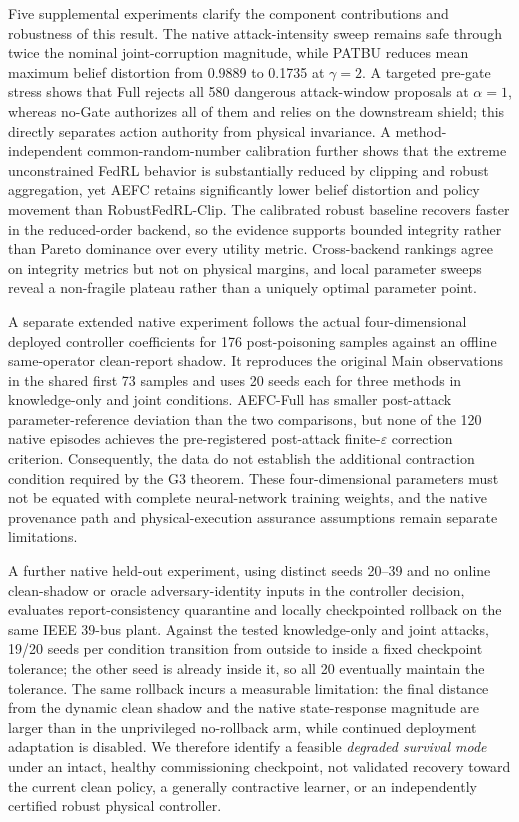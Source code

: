 Five supplemental experiments clarify the component contributions and robustness of this result. The native attack-intensity sweep remains safe through twice the nominal joint-corruption magnitude, while PATBU reduces mean maximum belief distortion from 0.9889 to 0.1735 at $\gamma=2$. A targeted pre-gate stress shows that Full rejects all 580 dangerous attack-window proposals at $\alpha=1$, whereas no-Gate authorizes all of them and relies on the downstream shield; this directly separates action authority from physical invariance. A method-independent common-random-number calibration further shows that the extreme unconstrained FedRL behavior is substantially reduced by clipping and robust aggregation, yet AEFC retains significantly lower belief distortion and policy movement than RobustFedRL-Clip. The calibrated robust baseline recovers faster in the reduced-order backend, so the evidence supports bounded integrity rather than Pareto dominance over every utility metric. Cross-backend rankings agree on integrity metrics but not on physical margins, and local parameter sweeps reveal a non-fragile plateau rather than a uniquely optimal parameter point.

A separate extended native experiment follows the actual four-dimensional deployed controller coefficients for 176 post-poisoning samples against an offline same-operator clean-report shadow. It reproduces the original Main observations in the shared first 73 samples and uses 20 seeds each for three methods in knowledge-only and joint conditions. AEFC-Full has smaller post-attack parameter-reference deviation than the two comparisons, but none of the 120 native episodes achieves the pre-registered post-attack finite-$\varepsilon$ correction criterion. Consequently, the data do not establish the additional contraction condition required by the G3 theorem. These four-dimensional parameters must not be equated with complete neural-network training weights, and the native provenance path and physical-execution assurance assumptions remain separate limitations.

A further native held-out experiment, using distinct seeds 20--39 and no online clean-shadow or oracle adversary-identity inputs in the controller decision, evaluates report-consistency quarantine and locally checkpointed rollback on the same IEEE 39-bus plant. Against the tested knowledge-only and joint attacks, 19/20 seeds per condition transition from outside to inside a fixed checkpoint tolerance; the other seed is already inside it, so all 20 eventually maintain the tolerance. The same rollback incurs a measurable limitation: the final distance from the dynamic clean shadow and the native state-response magnitude are larger than in the unprivileged no-rollback arm, while continued deployment adaptation is disabled. We therefore identify a feasible \emph{degraded survival mode} under an intact, healthy commissioning checkpoint, not validated recovery toward the current clean policy, a generally contractive learner, or an independently certified robust physical controller.

